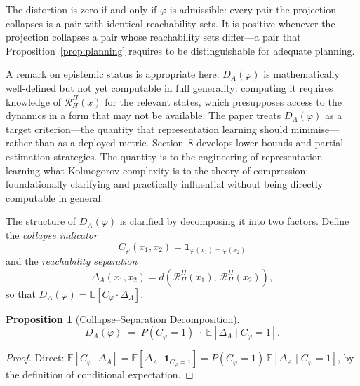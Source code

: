 \documentclass[11pt, a4paper]{article}
\theoremstyle{plain}
\newtheorem{proposition}{Proposition}
\theoremstyle{definition}
\theoremstyle{remark}
\newcommand{\RHP}{\mathcal{R}_H^\Pi}
\newcommand{\DA}{D_A(\varphi)}
\begin{document}
The distortion is zero if and only if $\varphi$ is admissible: every pair the
projection collapses is a pair with identical reachability sets. It is positive
whenever the projection collapses a pair whose reachability sets differ---a pair
that Proposition~\ref{prop:planning} requires to be distinguishable for adequate
planning.

A remark on epistemic status is appropriate here. $\DA$ is mathematically
well-defined but not yet computable in full generality: computing it requires
knowledge of $\RHP(x)$ for the relevant states, which presupposes access to the
dynamics in a form that may not be available. The paper treats $\DA$ as a target
criterion---the quantity that representation learning should minimise---rather
than as a deployed metric. Section~8 develops lower bounds and partial estimation
strategies. The quantity is to the engineering of representation learning what
Kolmogorov complexity is to the theory of compression: foundationally clarifying
and practically influential without being directly computable in general.

The structure of $\DA$ is clarified by decomposing it into two factors. Define
the \emph{collapse indicator}
\begin{equation}
  C_\varphi(x_1, x_2) = \mathbf{1}_{\varphi(x_1) = \varphi(x_2)}
\end{equation}
and the \emph{reachability separation}
\begin{equation}
  \Delta_A(x_1, x_2) = d\!\left(\RHP(x_1),\, \RHP(x_2)\right),
\end{equation}
so that $\DA = \mathbb{E}[C_\varphi \cdot \Delta_A]$.

\begin{proposition}[Collapse--Separation Decomposition]
\label{prop:decomp}
\begin{equation}
  \DA \;=\; P(C_\varphi = 1)\;\cdot\;\mathbb{E}\!\left[\Delta_A \mid C_\varphi = 1\right].
\end{equation}
\end{proposition}

\begin{proof}
Direct: $\mathbb{E}[C_\varphi \cdot \Delta_A]
= \mathbb{E}[\Delta_A \cdot \mathbf{1}_{C_\varphi=1}]
= P(C_\varphi=1)\,\mathbb{E}[\Delta_A \mid C_\varphi=1]$,
by the definition of conditional expectation.
\end{proof}
\end{document}
